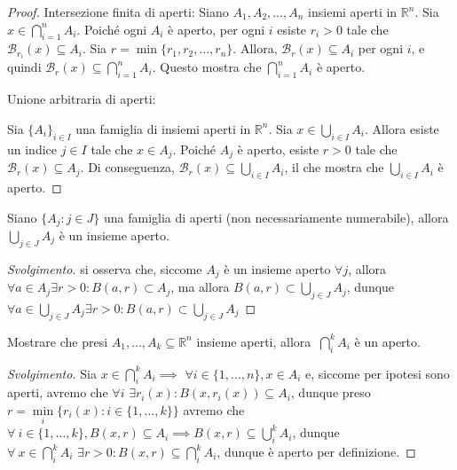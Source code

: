 %
\begin{proof}
	Intersezione finita di aperti:
	Siano $A_1, A_2, \dots, A_n$ insiemi aperti in $\mathbb{R}^n$. Sia $x \in \bigcap_{i=1}^n A_i$. Poiché ogni $A_i$ è aperto, per ogni $i$ esiste $r_i > 0$ tale che $\mathcal{B}_{r_i}(x) \subseteq A_i$. Sia $r = \min\{r_1, r_2, \dots, r_n\}$. Allora, $\mathcal{B}_r(x) \subseteq A_i$ per ogni $i$, e quindi $\mathcal{B}_r(x) \subseteq \bigcap_{i=1}^n A_i$. Questo mostra che $\bigcap_{i=1}^n A_i$ è aperto.
		
	Unione arbitraria di aperti:
		
	Sia $\{A_i\}_{i \in I}$ una famiglia di insiemi aperti in $\mathbb{R}^n$. Sia $x \in \bigcup_{i \in I} A_i$. Allora esiste un indice $j \in I$ tale che $x \in A_j$. Poiché $A_j$ è aperto, esiste $r > 0$ tale che $\mathcal{B}_r(x) \subseteq A_j$. Di conseguenza, $\mathcal{B}_r(x) \subseteq \bigcup_{i \in I} A_i$, il che mostra che $\bigcup\limits_{i \in I} A_i$ è aperto.
\end{proof}
%
\vspace{0.5cm}
\begin{exercise}
Siano $\{A_j: j \in J \}$ una famiglia di aperti (non necessariamente numerabile), allora $\bigcup\limits_{j \in J} A_j$ è un insieme aperto.
\label{exercise:union_open_set_is_open}
\end{exercise}
%
\begin{proof}[Svolgimento]
si osserva che, siccome $A_j$ è un insieme aperto $\forall j$, allora $\forall a \in A_j \exists r > 0: B(a, r) \subset A_j$, ma allora $B(a, r) \subset \bigcup\limits_{j \in J} A_j$, dunque $\forall a \in \bigcup\limits_{j \in J} A_j \exists r > 0: B(a, r) \subset \bigcup\limits_{j \in J} A_j$
\end{proof}
%
\vspace{0.5cm}
\begin{exercise}
Mostrare che presi $A_1, \ldots , A_k \subseteq \mathbb{R}^n$ insieme aperti, allora $\ \bigcap\limits_i^k A_i$ è un aperto.
\label{exercise:intersec_open_set_is_open}
\end{exercise}
%
\begin{proof}[Svolgimento]
Sia $x \in \bigcap\limits_{i}^k A_i \implies \, \, \forall i \in \{1, \ldots, n \}, x \in A_i$ e, siccome per ipotesi sono aperti, avremo che $\forall i \, \, \exists r_i(x) : B(x, r_i(x)) \subseteq A_i$, dunque preso $r=\min\limits_i{ \{ r_i(x) : i \in \{1, \ldots, k \} \} }$ avremo che $\forall\ i \in \{1, \ldots, k \}, B(x, r) \subseteq A_i \implies B(x, r) \subseteq \bigcup\limits_i^k A_i$,
dunque $\forall\ x \in \bigcap\limits_{i}^k A_i \, \, \exists r > 0 : B(x, r) \subseteq \bigcap\limits_i^k A_i$, dunque è aperto per definizione.
\end{proof}

